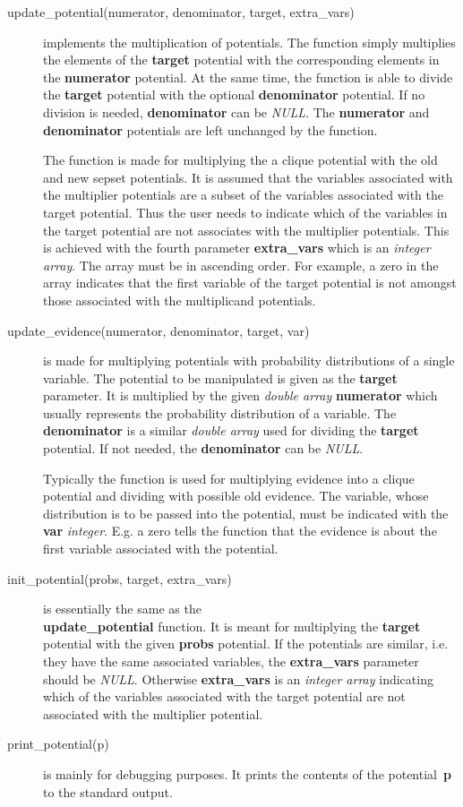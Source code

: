 \documentclass[12pt,a4paper]{report}
\begin{document}
\begin{description}
\item[update\_potential(numerator, denominator, target, extra\_vars)] 
implements the multiplication of potentials. The function simply
multiplies the elements of the \textbf{target} potential with the
corresponding elements in the \textbf{numerator} potential. At the
same time, the function is able to divide the \textbf{target}
potential with the optional \textbf{denominator} potential. If no
division is needed, \textbf{denominator} can be {\it NULL}.
The \textbf{numerator} and \textbf{denominator} potentials are left
unchanged by the function.

The function is made for multiplying the a clique potential with the 
old and new sepset potentials. It is assumed that the variables
associated with the multiplier potentials are a subset of the
variables associated with the target potential. Thus the user needs to
indicate which of the variables in the target potential are not
associates with the multiplier potentials. This is achieved with the
fourth parameter \textbf{extra\_vars} which is an {\it integer array}. 
The array must be in ascending order. For example, a zero in the array 
indicates that the first variable of the target potential is not
amongst those associated with the multiplicand potentials.

\item[update\_evidence(numerator, denominator, target, var)] is made
for multiplying potentials with probability distributions of a single
variable. The potential to be manipulated is given as the
\textbf{target} parameter. It is multiplied by the given {\it double
array} \textbf{numerator} which usually represents the probability
distribution of a variable. The \textbf{denominator} is a similar 
{\it double array} used for dividing the \textbf{target} potential. 
If not needed, the \textbf{denominator} can be {\it NULL}.

Typically the function is used for multiplying evidence into a clique 
potential and dividing with possible old evidence. The variable, whose 
distribution is to be passed into the potential, must be indicated 
with the \textbf{var} {\it integer}. E.g. a zero tells the function 
that the evidence is about the first variable associated with the potential.

\item[init\_potential(probs, target, extra\_vars)] is essentially the
same as the \\ \textbf{update\_potential} function. It is meant for
multiplying the \textbf{target} potential with the given
\textbf{probs} potential. If the potentials are similar, i.e. they
have the same associated variables, the \textbf{extra\_vars} parameter 
should be {\it NULL}. Otherwise \textbf{extra\_vars} is an 
{\it integer array} indicating which of the variables associated with
the target potential are not associated with the multiplier potential.

\item[print\_potential(p)] is mainly for debugging purposes. It prints 
the contents of the potential~\textbf{p} to the standard output.

\end{description}
\end{document}

